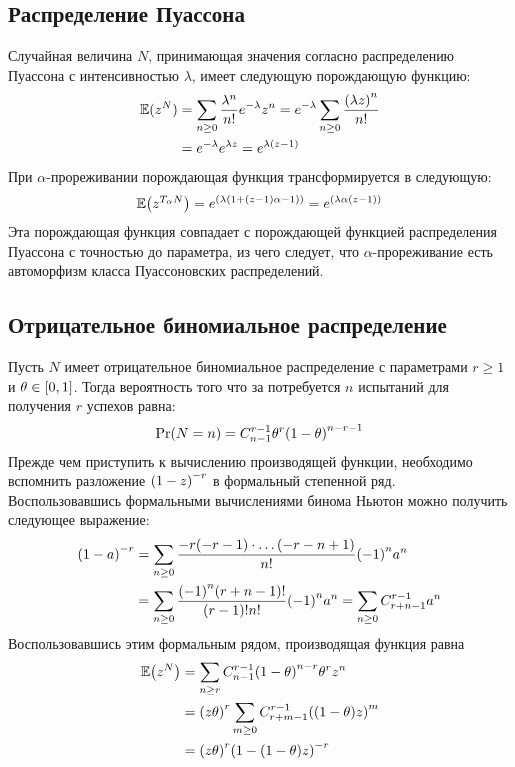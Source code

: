 \documentclass[a4paper]{article}
\let\originalleft\left
\let\originalright\right
\renewcommand{\left}{\mathopen{}\mathclose\bgroup\originalleft}
\renewcommand{\right}{\aftergroup\egroup\originalright}
\newcommand{\clo}[1]{{\left [ #1 \right ]}}
\newcommand{\brac}[1]{{\left ( #1 \right )}}
\newcommand{\Ex}[0]{{\mathbb{E}}}
\begin{document}
\subsection{Распределение Пуассона} %
\label{sub:Poisson_distribution}

Случайная величина $N$, принимающая значения согласно распределению Пуассона с
интенсивностью $\lambda$, имеет следующую порождающую функцию:
\begin{align*}
	\Ex(z^N) & = \sum_{n\geq 0} \frac{\lambda^n}{n!} e^{-\lambda} z^n
	= e^{-\lambda} \sum_{n\geq 0} \frac{\brac{\lambda z}^n}{n!} \\
	& = e^{-\lambda} e^{\lambda z} = e^{\lambda (z-1) }
\end{align*}
При $\alpha$-прореживании порождающая функция трансформируется в следующую:
\[\Ex\brac{z^{T_\alpha N}} = e^\brac{\lambda \brac{1 + (z-1) \alpha-1}} = e^\brac{\lambda \alpha (z-1)}\]
Эта порождающая функция совпадает с порождающей функцией распределения
Пуассона с точностью до параметра, из чего следует, что $\alpha$-прореживание
есть автоморфизм класса Пуассоновских распределений.


\subsection{Отрицательное биномиальное распределение} %
\label{sub:negative_binomial}

Пусть $N$ имеет отрицательное биномиальное распределение с параметрами $r\geq1$
и $\theta\in \clo{0,1}$.
Тогда вероятность того что за потребуется $n$ испытаний для получения $r$
успехов равна:
\[\Pr(N=n) = C^{r-1}_{n-1} \theta^r \brac{1-\theta}^{n-r-1}\]
Прежде чем приступить к вычислению производящей функции, необходимо вспомнить
разложение $\brac{1-z}^{-r}$ в формальный степенной ряд. Воспользовавшись
формальными вычислениями бинома Ньютон можно получить следующее выражение:
\begin{align*}
\brac{1-a}^{-r} &= \sum_{n\geq 0} \frac{-r(-r-1)\cdot\ldots(-r-n+1)}{n!} \brac{-1}^n a^n \\
	&= \sum_{n\geq 0} \frac{{(-1)}^n (r+n-1)!}{(r-1)!n!} \brac{-1}^n a^n
	= \sum_{n\geq 0} C^{r-1}_{r+n-1} a^n
\end{align*}
Воспользовавшись этим формальным рядом, производящая функция равна
\begin{align*}
	\Ex\brac{z^N} &= \sum_{n\geq r} C^{r-1}_{n-1} \brac{1-\theta}^{n-r} \theta^r z^n \\
	&= {(z \theta)}^r \sum_{m\geq 0} C^{r-1}_{r+m-1} \brac{(1-\theta)z}^m \\
	&= {(z \theta)}^r \brac{1 - (1-\theta)z}^{-r} 
\end{align*}
\end{document}

